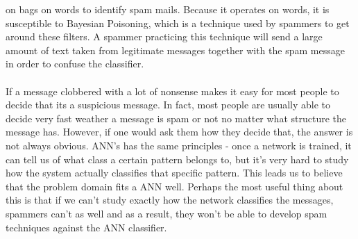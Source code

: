 on bags on words to identify spam mails. Because it operates on words, it is
susceptible to Bayesian Poisoning, which is a technique used by spammers to get
around these filters. A spammer practicing this technique will send a large
amount of text taken from legitimate messages together with the spam message in
order to confuse the classifier.  \\\\ If a message clobbered with a lot of
nonsense makes it easy for most people to decide that its a suspicious message.
In fact, most people are usually able to decide very fast weather a message is
spam or not no matter what structure the message has. However, if one would ask
them how they decide that, the answer is not always obvious.  ANN's has the
same principles - once a network is trained, it can tell us of what class a
certain pattern belongs to, but it's very hard to study how the system actually
classifies that specific pattern. This leads us to believe that the problem
domain fits a ANN well. Perhaps the most useful thing about this is that if we
can't study exactly how the network classifies the messages, spammers can't as
well and as a result, they won't be able to develop spam techniques against the
ANN classifier.
